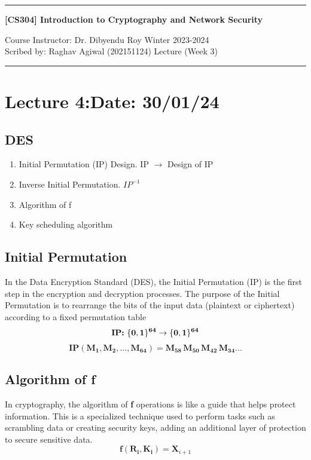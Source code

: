 \documentclass[11pt]{article}
\begin{document}
\noindent
\rule{\textwidth}{1pt}
\begin{center}
{\bf [CS304] Introduction to Cryptography and Network Security}
\end{center}
Course Instructor: Dr. Dibyendu Roy \hfill Winter 2023-2024\\
Scribed by: Raghav Agiwal (202151124) \hfill Lecture (Week 3)
\\
\rule{\textwidth}{1pt}
\section{Lecture 4:\hfill \small{Date: 30/01/24}}
\subsection{DES}
\begin{enumerate}
    \item Initial Permutation (IP) Design.   IP $\rightarrow$ Design of IP
    \item Inverse Initial Permutation. $IP^{-1}$
    \item Algorithm of f
    \item Key scheduling algorithm
\end{enumerate}
\subsection{Initial Permutation}
{In the Data Encryption Standard (DES), the Initial Permutation (IP) is the first step in the encryption and decryption processes. The purpose of the Initial Permutation is to rearrange the bits of the input data (plaintext or ciphertext) according to a fixed permutation table
}
\begin{equation}
    \text{\textbf{IP:} } \mathbf{\{ 0, 1 \}^{64} \rightarrow \{ 0, 1 \}^{64}}
\end{equation}
\begin{equation}
    \boldsymbol{\mathbf{IP}} (\boldsymbol{M_1}, \boldsymbol{M_2}, \ldots, \boldsymbol{M_{64}}) = \boldsymbol{M_{58}} \, \boldsymbol{M_{50}} \, \boldsymbol{M_{42}} \, \boldsymbol{M_{34}}...
\end{equation}

\subsection{Algorithm of f}
{In cryptography, the algorithm of \textbf{f} operations is like a guide that helps protect information. This is a specialized technique used to perform tasks such as scrambling data or creating security keys, adding an additional layer of protection to secure sensitive data.}
\begin{equation}
\boldsymbol{f} (\boldsymbol{R_i}, \boldsymbol{K_i}) = \boldsymbol{X}_{i+1}
\end{equation}
\end{document}
